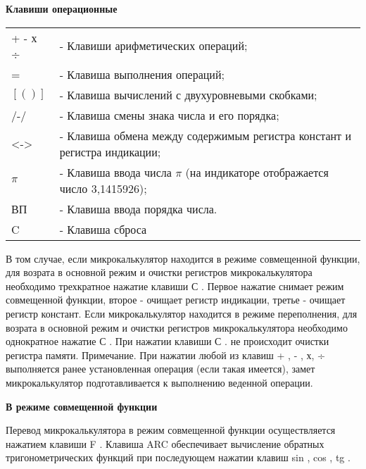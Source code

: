 \documentclass[12pt]{article} %
\begin{document}
\textbf{Клавиши операционные}
\vspace{0.5cm}

\begin{tabular}{ p{2cm} p{9cm} }
+ - х ÷ & - Клавиши арифметических операций;\\
= & - Клавиша выполнения операций;\\ 
$[(  )]$ & - Клавиша вычислений с двухуровневыми скобками;\\
/-/ & - Клавиша смены знака числа и его порядка;\\
<-> & - Клавиша обмена между содержимым регистра констант и регистра индикации;\\
$\pi$ & - Клавиша ввода числа $\pi$ (на индикаторе отображается число 3,1415926);\\
ВП & - Клавиша ввода порядка числа.\\
C & - Клавиша сброса\\
\end{tabular}
\vspace{0.5cm}

В том случае, если микрокалькулятор находится в режиме совмещенной функции, для возрата в основной режим и очистки регистров микрокалькулятора необходимо трехкратное нажатие клавиши С . Первое нажатие снимает режим совмещенной функции, второе - очищает регистр индикации, третье - очищает регистр констант. Если микрокалькулятор находится в режиме переполнения, для возрата в основной режим и очистки регистров микрокалькулятора необходимо однократное нажатие С .
При нажатии клавиши С . не происходит очистки регистра памяти.
Примечание. При нажатии любой из клавиш + , - , х, ÷ выполняется ранее установленная операция (если такая имеется), замет микрокалькулятор подготавливается к выполнению веденной операции.

\newpage
\textbf{В режиме совмещенной функции}

Перевод микрокалькулятора в режим совмещенной функции осуществляется нажатием клавиши F . Клавиша ARC обеспечивает вычисление обратных тригонометрических функций при последующем нажатии клавиш  sin , cos , tg .
\end{document}
